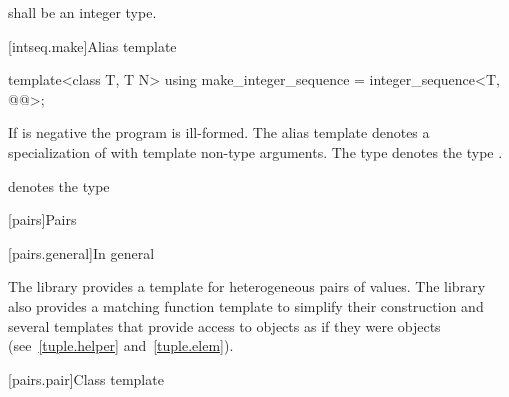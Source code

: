 \pnum
{} shall be an integer type.

[intseq.make]{Alias template }

%
\begin{itemdecl}
template<class T, T N>
  using make_integer_sequence = integer_sequence<T, @\seebelow{}@>;
\end{itemdecl}

\begin{itemdescr}
\pnum
If  is negative the program is ill-formed. The alias template
 denotes a specialization of
 with  template non-type arguments.
The type  denotes the type
.
\begin{note}  denotes the type
 \end{note}
\end{itemdescr}

[pairs]{Pairs}

[pairs.general]{In general}

\pnum
The library provides a template for heterogeneous pairs of values.
The library also provides a matching function template to simplify
their construction and several templates that provide access to 
objects as if they were  objects (see~\ref{tuple.helper}
and~\ref{tuple.elem}).%
%
%
%

[pairs.pair]{Class template }

